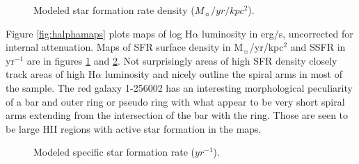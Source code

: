 \documentclass[modern]{aastex62}
\begin{document}
\begin{figure}[hb]
\centering
{}
\caption{Modeled star formation rate density ($M_\sun/yr/kpc^2$).}
\label{fig:sigmasfrmaps}
\end{figure}

Figure \ref{fig:halphamaps} plots maps of log H$\alpha$ luminosity in erg/s, uncorrected for internal attenuation. Maps of SFR surface density in M$_\sun$/yr/kpc$^2$ and SSFR in yr$^{-1}$ are in figures \ref{fig:sigmasfrmaps} and \ref{fig:ssfrmaps}. Not surprisingly areas of high SFR density closely track areas of high H$\alpha$ luminosity and nicely outline the spiral arms in most of the sample. The red galaxy 1-256002 has an interesting morphological peculiarity of a bar and outer ring or pseudo ring with what appear to be very short spiral arms extending from the intersection of the bar with the ring. Those are seen to be large HII regions with active star formation in the maps.

\begin{figure}[ht]
\centering
{}
\caption{Modeled specific star formation rate ($yr^{-1}$).}
\label{fig:ssfrmaps}
\end{figure}
\end{document}
